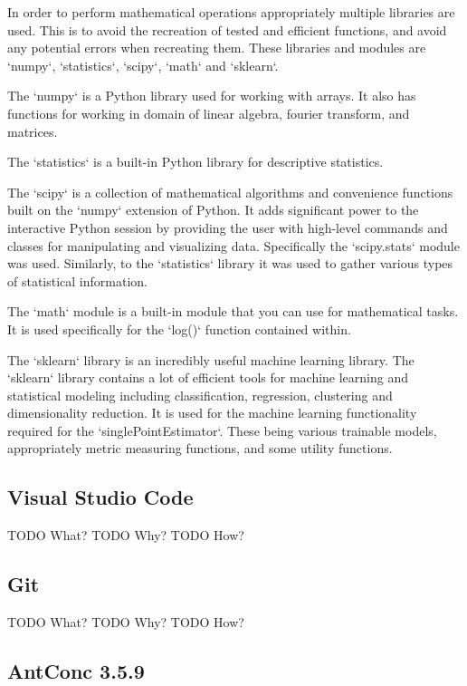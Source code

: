 In order to perform mathematical operations appropriately multiple libraries are used. This is to avoid the recreation of tested and efficient functions, and avoid any potential errors when recreating them. These libraries and modules are `numpy`, `statistics`, `scipy`, `math` and `sklearn`.

The `numpy` is a Python library used for working with arrays. It also has functions for working in domain of linear algebra, fourier transform, and matrices.

The `statistics` is a built-in Python library for descriptive statistics.

The `scipy` is a collection of mathematical algorithms and convenience functions built on the `numpy` extension of Python. It adds significant power to the interactive Python session by providing the user with high-level commands and classes for manipulating and visualizing data. Specifically the `scipy.stats` module was used. Similarly, to the `statistics` library it was used to gather various types of statistical information.

The `math` module is a built-in module that you can use for mathematical tasks. It is used specifically for the `log()` function contained within.

The `sklearn` library is an incredibly useful machine learning library. The `sklearn` library contains a lot of efficient tools for machine learning and statistical modeling including classification, regression, clustering and dimensionality reduction. It is used for the machine learning functionality required for the `singlePointEstimator`. These being various trainable models, appropriately metric measuring functions, and some utility functions.

\subsection{Visual Studio Code}

TODO What?
TODO Why?
TODO How?

\subsection{Git}

TODO What?
TODO Why?
TODO How?

\subsection{AntConc 3.5.9}

